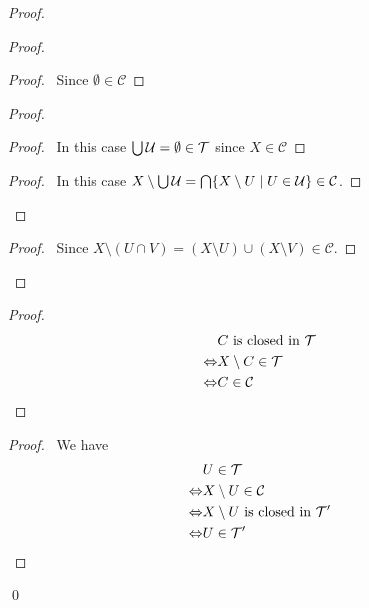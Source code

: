 \begin{proof}
    \pf
    \begin{proof}
        \begin{proof}
            \pf\ Since $\emptyset \in \mathcal{C}$
        \end{proof}
        \begin{proof}
            \begin{proof}
                \pf\ In this case $\bigcup \mathcal{U} = \emptyset \in \mathcal{T}$ since $X \in \mathcal{C}$
            \end{proof}
            \begin{proof}
                \pf\ In this case $X \setminus \bigcup \mathcal{U} = \bigcap \{ X \setminus U \mid U \in \mathcal{U} \} \in
                \mathcal{C}$.
            \end{proof}
        \end{proof}
        \begin{proof}
            \pf\ Since $X \setminus (U \cap V) = (X \setminus U) \cup (X \setminus V) \in \mathcal{C}$.
        \end{proof}
    \end{proof}
    \begin{proof}
        \pf
        \begin{align*}
            & C \text{ is closed in } \mathcal{T} \\
            \Leftrightarrow & X \setminus C \in \mathcal{T} \\
            \Leftrightarrow & C \in \mathcal{C}
        \end{align*}
    \end{proof}
    \begin{proof}
        \pf\ 
        We have
        \begin{align*}
            & U \in \mathcal{T} \\
            \Leftrightarrow & X \setminus U \in \mathcal{C} \\
            \Leftrightarrow & X \setminus U \text{ is closed in } \mathcal{T}' \\
            \Leftrightarrow & U \in \mathcal{T}'
        \end{align*}
    \end{proof}
    \qed
\end{proof}

